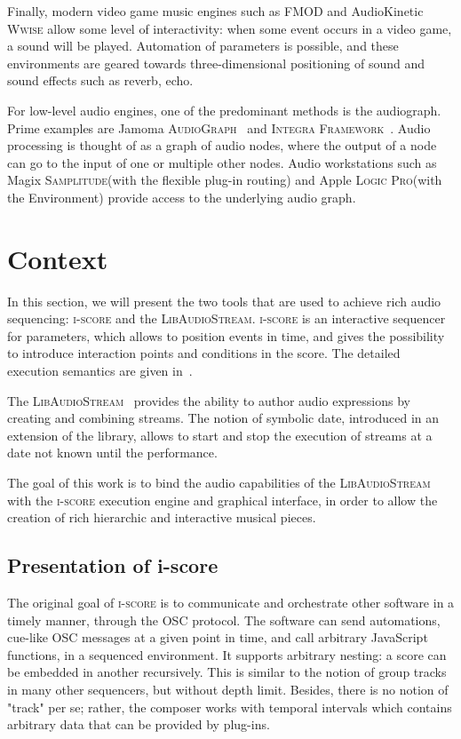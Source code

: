 \documentclass{article}
\newcommand*{\LibAudioStream}{\textsc{LibAudioStream}\xspace}
\newcommand*{\iscore}{\textsc{i-score}\xspace}
\newcommand*{\logic}{Apple \textsc{Logic Pro}\xspace}
\newcommand*{\samplitude}{Magix \textsc{Samplitude}\xspace}
\newcommand*{\jamomaaudiograph}{Jamoma \textsc{AudioGraph}\xspace}
\newcommand*{\integraframework}{\textsc{Integra Framework}\xspace}
\newcommand*{\wwise}{AudioKinetic \textsc{Wwise}\xspace}
\newcommand*{\fmod}{\textsc{FMOD}\xspace}
\begin{document}
Finally, modern video game music engines such as \fmod and \wwise allow some level of interactivity: when some event occurs in a video game, a sound will be played. 
Automation of parameters is possible, and these environments are geared towards three-dimensional positioning of sound and sound effects such as reverb, echo.

For low-level audio engines, one of the predominant methods is the audiograph.
Prime examples are \jamomaaudiograph~\cite{place2010jamoma} and \integraframework~\cite{bullock2011integra}.
Audio processing is thought of as a graph of audio nodes, where the output of a node can go to the input of one or multiple other nodes.
Audio workstations such as \samplitude (with the flexible plug-in routing) and \logic (with the Environment) provide access to the underlying audio graph.

\section{Context}
In this section, we will present the two tools that are used to achieve 
rich audio sequencing: \iscore and the \LibAudioStream.
\iscore is an interactive sequencer for parameters, which allows to position events 
in time, and gives the possibility to introduce interaction points and 
conditions in the score.
The detailed execution semantics are given in~\cite{celerier2015ossia}.

The \LibAudioStream~\cite{letzlibaudiostream} provides the ability to author audio expressions
by creating and combining streams. The notion of symbolic date, introduced in an extension of the library,
allows to start and stop the execution of streams at a date not known until the performance.

The goal of this work is to bind the audio capabilities of the \LibAudioStream 
with the \iscore execution engine and graphical interface, in order to allow 
the creation of rich hierarchic and interactive musical pieces.

\subsection{Presentation of i-score}
The original goal of \iscore is to communicate and orchestrate other software in a timely manner, 
through the OSC protocol.
The software can send automations, cue-like OSC messages at a given point in time, and call arbitrary JavaScript functions, in a sequenced environment.
It supports arbitrary nesting: a score can be embedded in another recursively.
This is similar to the notion of group tracks in many other sequencers, but without depth limit. 
Besides, there is no notion of "track" per se; rather, the composer works with 
temporal intervals which contains arbitrary data that can be provided by plug-ins.
\end{document}
